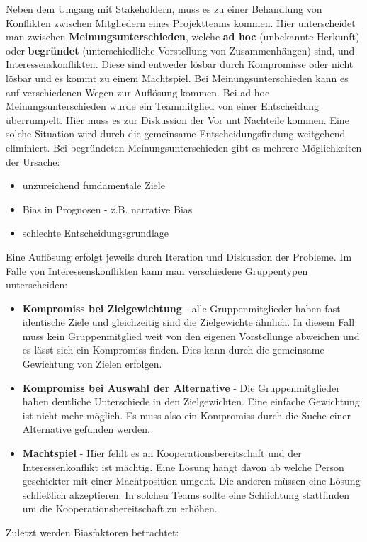 Neben dem Umgang mit Stakeholdern, muss es zu einer Behandlung von
Konflikten zwischen Mitgliedern eines Projektteams kommen.
Hier unterscheidet man zwischen \textbf{Meinungsunterschieden}, welche
\textbf{ad hoc} (unbekannte Herkunft) oder \textbf{begründet} (unterschiedliche Vorstellung von Zusammenhängen) sind, und Interessenskonflikten.
Diese sind entweder lösbar durch Kompromisse oder nicht lösbar und es kommt
zu einem Machtspiel.
Bei Meinungsunterschieden kann es auf verschiedenen Wegen zur Auflösung kommen.
Bei ad-hoc Meinungsunterschieden wurde ein Teammitglied von einer Entscheidung
überrumpelt. Hier muss es zur Diskussion der Vor unt Nachteile kommen.
Eine solche Situation wird durch die gemeinsame Entscheidungsfindung
weitgehend eliminiert. Bei begründeten Meinungsunterschieden gibt es mehrere
Möglichkeiten der Ursache:
\begin{itemize}
    \item unzureichend fundamentale Ziele
    \item Bias in Prognosen - z.B. narrative Bias
    \item schlechte Entscheidungsgrundlage
\end{itemize}
Eine Auflösung erfolgt jeweils durch Iteration und Diskussion der Probleme.
Im Falle von Interessenskonflikten kann man verschiedene Gruppentypen
unterscheiden:
\begin{itemize}
    \item \textbf{Kompromiss bei Zielgewichtung} - alle Gruppenmitglieder haben
    fast identische Ziele und gleichzeitig sind die Zielgewichte ähnlich. In diesem
    Fall muss kein Gruppenmitglied weit von den eigenen Vorstellunge abweichen
    und es lässt sich ein Kompromiss finden. Dies kann
    durch die gemeinsame Gewichtung von Zielen erfolgen.
    \item \textbf{Kompromiss bei Auswahl der Alternative} - Die Gruppenmitglieder
    haben deutliche Unterschiede in den Zielgewichten. Eine einfache Gewichtung
    ist nicht mehr möglich. Es muss also ein Kompromiss durch die Suche
    einer Alternative gefunden werden.
    \item \textbf{Machtspiel} - Hier fehlt es an Kooperationsbereitschaft
    und der Interessenkonflikt ist mächtig. Eine Lösung hängt davon ab
    welche Person geschickter mit einer Machtposition umgeht. Die anderen
    müssen eine Lösung schließlich akzeptieren. In solchen Teams sollte eine
    Schlichtung stattfinden um die Kooperationsbereitschaft zu erhöhen.
\end{itemize}
Zuletzt werden Biasfaktoren betrachtet:
